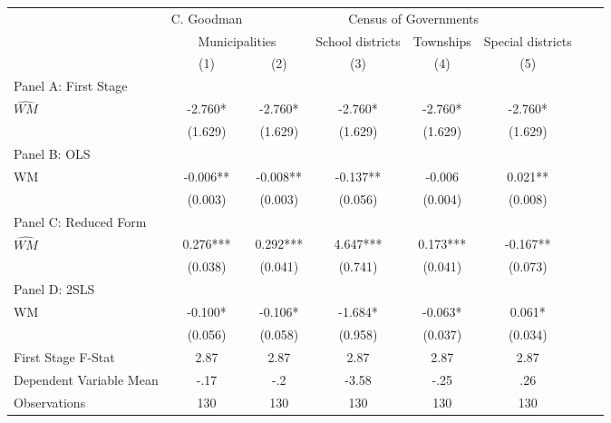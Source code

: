  \begin{tabular}{l*{7}{c}} \toprule
&\multicolumn{1}{c}{C. Goodman}&\multicolumn{4}{c}{Census of Governments}\\\cmidrule(lr){2-2}\cmidrule(lr){3-6}
&\multicolumn{2}{c}{Municipalities}&\multicolumn{1}{c}{School districts}&\multicolumn{1}{c}{Townships}&\multicolumn{1}{c}{Special districts}\\\cmidrule(lr){2-3}\cmidrule(lr){4-6}
&\multicolumn{1}{c}{(1)}&\multicolumn{1}{c}{(2)}&\multicolumn{1}{c}{(3)}&\multicolumn{1}{c}{(4)}&\multicolumn{1}{c}{(5)}\\
\cmidrule(lr){1-6}
\multicolumn{5}{l}{Panel A: First Stage}\\
\cmidrule(lr){1-6}
$\widehat{WM}$  &   -2.760*  &   -2.760*  &   -2.760*  &   -2.760*  &   -2.760*  \\
                &  (1.629)   &  (1.629)   &  (1.629)   &  (1.629)   &  (1.629)   \\
\cmidrule(lr){1-6}
\multicolumn{5}{l}{Panel B: OLS}\\
\cmidrule(lr){1-6}
WM              &   -0.006** &   -0.008** &   -0.137** &   -0.006   &    0.021** \\
                &  (0.003)   &  (0.003)   &  (0.056)   &  (0.004)   &  (0.008)   \\
\cmidrule(lr){1-6}
\multicolumn{5}{l}{Panel C: Reduced Form}\\
\cmidrule(lr){1-6}
$\widehat{WM}$  &    0.276***&    0.292***&    4.647***&    0.173***&   -0.167** \\
                &  (0.038)   &  (0.041)   &  (0.741)   &  (0.041)   &  (0.073)   \\
\cmidrule(lr){1-6}
\multicolumn{5}{l}{Panel D: 2SLS}\\
\cmidrule(lr){1-6}
WM              &   -0.100*  &   -0.106*  &   -1.684*  &   -0.063*  &    0.061*  \\
                &  (0.056)   &  (0.058)   &  (0.958)   &  (0.037)   &  (0.034)   \\
\midrule
First Stage F-Stat&     2.87   &     2.87   &     2.87   &     2.87   &     2.87   \\
Dependent Variable Mean&     -.17   &      -.2   &    -3.58   &     -.25   &      .26   \\
Observations    &      130   &      130   &      130   &      130   &      130   \\
       \bottomrule \end{tabular}
